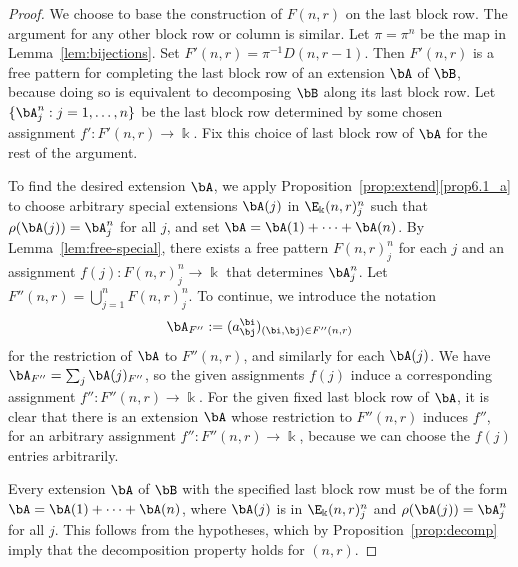 \begin{proof} 
We choose to base the construction of $F(n,r)$ on the last block
row. The argument for any other block row or column is similar. Let
$\pi = \pi^n$ be the map in Lemma~\ref{lem:bijections}. Set $F'(n,r)
= \pi^{-1} D(n,r-1)$. Then $F'(n,r)$ is a free pattern for completing
the last block row of an extension $\bA$ of $\bB$, because doing so is
equivalent to decomposing $\bB$ along its last block row. Let $\{
\bA^n_j: j=1, \dots, n \}$ be the last block row determined by some
chosen assignment $f': F'(n,r) \to \Bbbk$. Fix this choice of last
block row of $\bA$ for the rest of the argument.

To find the desired extension $\bA$, we apply Proposition~\ref{prop:extend}\ref{prop6.1_a} to choose arbitrary special extensions $\bA(j)$
in $\E_\Bbbk(n,r)^n_j$ such that $\rho(\bA(j)) = \bA^n_j$ for all $j$,
and set $\bA = \bA(1) + \cdots + \bA(n)$. By Lemma~\ref{lem:free-special}, there exists a free pattern $F(n,r)^n_j$ for
each $j$ and an assignment $f(j): F(n,r)^n_j \to \Bbbk$ that
determines $\bA^n_j$. Let $F''(n,r) = \bigcup_{j=1}^n F(n,r)^n_j$. To
continue, we introduce the notation
\[
\bA_{F''} := (a^\bi_\bj)_{(\bi,\bj) \in F''(n,r)}
\]
for the restriction of $\bA$ to $F''(n,r)$, and similarly for each
$\bA(j)$. We have $\bA_{F''} = \sum_j \bA(j)_{F''}$, so the given
assignments $f(j)$ induce a corresponding assignment $f'': F''(n,r)
\to \Bbbk$. For the given fixed last block row of $\bA$, it is clear
that there is an extension $\bA$ whose restriction to $F''(n,r)$
induces $f''$, for an arbitrary assignment $f'': F''(n,r) \to \Bbbk$,
because we can choose the $f(j)$ entries arbitrarily.

Every extension $\bA$ of $\bB$ with the specified last block row must
be of the form $\bA = \bA(1)+\cdots +\bA(n)$, where $\bA(j)$ is in
$\E_\Bbbk(n,r)^n_j$ and $\rho(\bA(j)) = \bA^n_j$ for all $j$. This
follows from the hypotheses, which by Proposition~\ref{prop:decomp}
imply that the decomposition property holds for $(n,r)$.


\end{proof}
